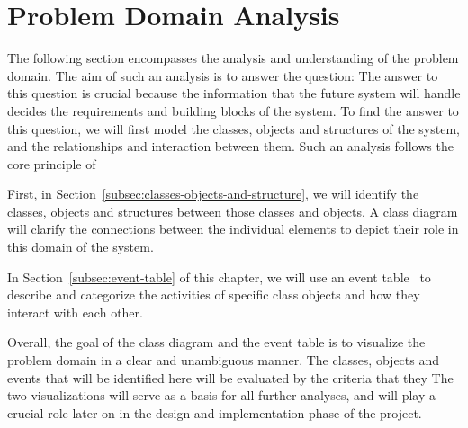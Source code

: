 \section{Problem Domain Analysis}\label{sec:problem-domain-analysis}

The following section encompasses the analysis and understanding of the problem domain.
The aim of such an analysis is to answer the question:
The answer to this question is crucial because the information that the future system will handle decides the
requirements and building blocks of the system.
To find the answer to this question, we will first model the classes, objects and structures of the system, and the
relationships and interaction between them.
Such an analysis follows the core principle of

First, in Section~\ref{subsec:classes-objects-and-structure}, we will identify the classes, objects and structures
between those classes and objects.
A class diagram will clarify the connections between the individual elements to depict their role in this domain of the
system.

In Section~\ref{subsec:event-table} of this chapter, we will use an event table~\cite[52]{mathiassen2018} to describe
and categorize the activities of specific class objects and how they interact with each other.

Overall, the goal of the class diagram and the event table is to visualize the problem domain in a clear and unambiguous
manner.
The classes, objects and events that will be identified here will be evaluated by the criteria that they
The two visualizations will serve as a basis for all further analyses, and will play a crucial role later on in the
design and implementation phase of the project.



